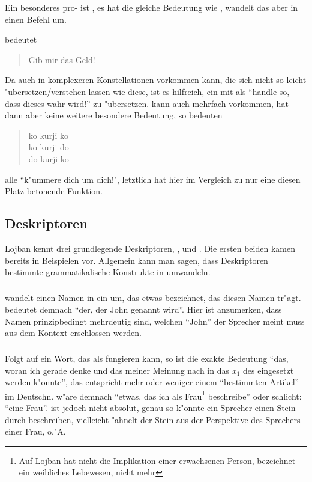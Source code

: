 Ein besonderes pro- ist , es hat die gleiche Bedeutung wie , wandelt das  aber in einen Befehl um.
\begin{quote}
\end{quote}
bedeutet
\begin{quote}
Gib mir das Geld!
\end{quote}
Da  auch in komplexeren Konstellationen vorkommen kann, die sich nicht so leicht "ubersetzen/verstehen lassen wie diese, ist es hilfreich, ein  mit  als ``handle so, dass dieses  wahr wird!'' zu "ubersetzen.
 kann auch mehrfach vorkommen, hat dann aber keine weitere besondere Bedeutung, so bedeuten
\begin{quote}
ko kurji ko \\
ko kurji do \\
do kurji ko
\end{quote}
alle ``k"ummere dich um dich!", letztlich hat hier  im Vergleich zu  nur eine diesen Platz betonende Funktion.

\subsection{Deskriptoren}
Lojban kennt drei grundlegende Deskriptoren, ,  und . Die ersten beiden kamen bereits in Beispielen vor.
Allgemein kann man sagen, dass Deskriptoren bestimmte grammatikalische Konstrukte in  umwandeln.

\subsubsection{}
 wandelt einen Namen in ein  um, das etwas bezeichnet, das diesen Namen tr"agt.  bedeutet demnach ``der,
der John genannt wird''. Hier ist anzumerken, dass Namen prinzipbedingt mehrdeutig sind, welchen ``John'' der Sprecher meint muss aus dem Kontext
erschlossen werden.

\subsubsection{}
Folgt auf  ein Wort, das als  fungieren kann, so ist die exakte Bedeutung ``das, woran ich gerade denke und das meiner
Meinung nach in das $x_1$ des  eingesetzt werden k"onnte'', das entspricht mehr oder weniger einem ``bestimmten Artikel'' im Deutschn.
 w"are demnach ``etwas, das ich als Frau\footnote{Auf Lojban hat  nicht die Implikation einer erwachsenen Person,
 bezeichnet ein weibliches Lebewesen, nicht mehr} beschreibe'' oder schlicht: ``eine Frau''.  ist jedoch nicht absolut,
genau so k"onnte ein Sprecher einen Stein durch  beschreiben, vielleicht "ahnelt der Stein aus der Perspektive des Sprechers einer
Frau, o."A.

